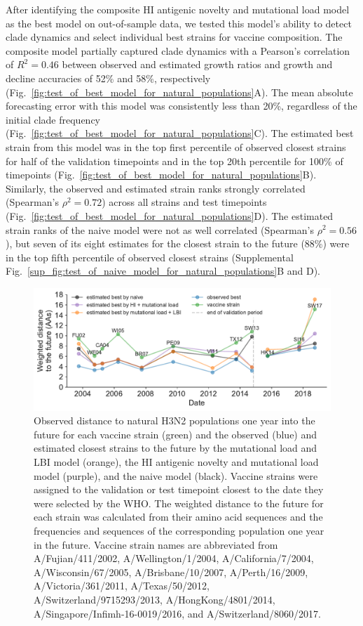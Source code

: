 After identifying the composite HI antigenic novelty and mutational load model as the best model on out-of-sample data, we tested this model's ability to detect clade dynamics and select individual best strains for vaccine composition.
The composite model partially captured clade dynamics with a Pearson's correlation of $R^2 = 0.46$ between observed and estimated growth ratios and growth and decline accuracies of 52\% and 58\%, respectively (Fig.~\ref{fig:test_of_best_model_for_natural_populations}A).
The mean absolute forecasting error with this model was consistently less than 20\%, regardless of the initial clade frequency (Fig.~\ref{fig:test_of_best_model_for_natural_populations}C).
The estimated best strain from this model was in the top first percentile of observed closest strains for half of the validation timepoints and in the top 20th percentile for 100\% of timepoints (Fig.~\ref{fig:test_of_best_model_for_natural_populations}B).
Similarly, the observed and estimated strain ranks strongly correlated (Spearman's $\rho^2 = 0.72$) across all strains and test timepoints (Fig.~\ref{fig:test_of_best_model_for_natural_populations}D).
The estimated strain ranks of the naive model were not as well correlated (Spearman's $\rho^2 = 0.56$), but seven of its eight estimates for the closest strain to the future (88\%) were in the top fifth percentile of observed closest strains (Supplemental Fig.~\ref{sup_fig:test_of_naive_model_for_natural_populations}B and D).

\begin{figure}[htb]
  \begin{center}
  \includegraphics[width=\textwidth]{figures/vaccine-comparison.pdf}
  \caption{
    Observed distance to natural H3N2 populations one year into the future for each vaccine strain (green) and the observed (blue) and estimated closest strains to the future by the mutational load and LBI model (orange), the HI antigenic novelty and mutational load model (purple), and the naive model (black).
    Vaccine strains were assigned to the validation or test timepoint closest to the date they were selected by the WHO.
    The weighted distance to the future for each strain was calculated from their amino acid sequences and the frequencies and sequences of the corresponding population one year in the future.
    Vaccine strain names are abbreviated from A/Fujian/411/2002, A/Wellington/1/2004, A/California/7/2004, A/Wisconsin/67/2005, A/Brisbane/10/2007, A/Perth/16/2009, A/Victoria/361/2011, A/Texas/50/2012, A/Switzerland/9715293/2013, A/HongKong/4801/2014, A/Singapore/Infimh-16-0019/2016, and A/Switzerland/8060/2017.
  }
  \label{fig:vaccine_comparison}
  \end{center}
\end{figure}


